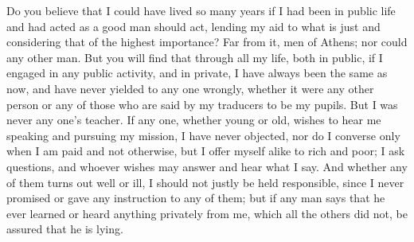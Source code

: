 \documentclass[letterpaper,12pt]{article}
\newcommand{\stephpag}[1]{\marginnote{\small\itshape\fontfamily{ppl}\selectfont #1}}
\begin{document}
Do you believe that I could have lived so many years if I had been in public life and had acted as a good man should act, lending my aid to what is just and considering that of the highest importance? Far from it, men of Athens; nor could \stephpag{33 a} any other man. But you will find that through all my life, both in public, if I engaged in any public activity, and in private, I have always been the same as now, and have never yielded to any one wrongly, whether it were any other person or any of those who are said by my traducers to be my pupils. But I was never any one's teacher. If any one, whether young or old, wishes to hear me speaking and pursuing my mission, I have never objected, \stephpag{b} nor do I converse only when I am paid and not otherwise, but I offer myself alike to rich and poor; I ask questions, and whoever wishes may answer and hear what I say. And whether any of them turns out well or ill, I should not justly be held responsible, since I never promised or gave any instruction to any of them; but if any man says that he ever learned or heard anything privately from me, which all the others did not, be assured that he is lying.
\end{document}
